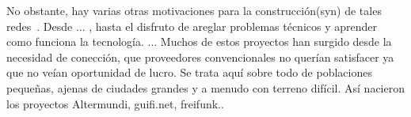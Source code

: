 No obstante, hay varias otras motivaciones para la construcción(syn) de tales redes~\autocite{Vaseva2016b}.
Desde ... , hasta el disfruto de areglar problemas técnicos y aprender como funciona la tecnología.
...
Muchos de estos proyectos han surgido desde la necesidad de conección, que proveedores convencionales no querían satisfacer ya que no veían oportunidad de lucro.
Se trata aquí sobre todo de poblaciones pequeñas, ajenas de ciudades grandes y a menudo con terreno difícil.
Así nacieron los proyectos Altermundi, guifi.net, freifunk..



\begin{comment}

"
https://pillku.org/article/altermundi-y-las-redes-comunitarias-digitales/
AlterMundi y las redes comunitarias, historia y perspectivas
Entrevista a Nicolás Echániz sobre el trabajo de AlterMundi en relación a las redes comunitarias digitales.Definiciones, desafíos, estrategias y propuestas
7 de febrero de 2015

Decimos que una Red Libre tiene estas características:

* libre uso: puede ser utilizada por sus participantes para ofrecer y recibir cualquier tipo de servicio que no afecte su buen funcionamiento
* neutralidad: no inspecciona ni modifica los flujos de datos dentro de la red más allá de lo necesario para su operación
* libre interconexión: permite, de forma libre y gratuita, el flujo de datos con otras redes que respeten las mismas condiciones
* libre tránsito: provee a otras redes libres acceso a las redes con las que mantiene acuerdos voluntarios de libre interconexión.

Una Red Comunitaria es una Red Libre en la que, además de las características ya enunciadas, se presentan otras:

* propiedad colectiva: su infraestructura es propiedad de la comunidad que la despliega;
* gestión social: la red es gestionada por la misma comunidad;
* diseño accesible: la información sobre cómo funciona la red y sus componentes es pública y accesible;
* participación abierta: cualquiera puede extender la red, respetando su diseño y sus principios.

Nuestro trabajo se centra principalmente en el desarrollo de un modelo de red específicamente adaptado a la realidad de pequeñas poblaciones digitalmente excluidas por el modelo comercial tradicional.
La misión de las redes comunitarias puede variar de un sitio a otro, pero en general tienden a empoderar al pueblo en el uso y comprensión de la tecnología y a promover un acceso más inclusivo a los recursos digitales, locales y externos.



\end{comment}
